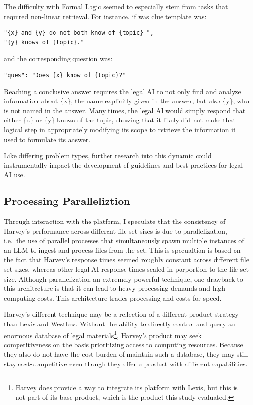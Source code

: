 \documentclass[
]{article}
\begin{document}
The difficulty with Formal Logic seemed to especially stem from tasks that required non-linear retrieval. For instance, if was clue template was:

\begin{verbatim}
"{x} and {y} do not both know of {topic}.",
"{y} knows of {topic}."
\end{verbatim}

and the corresponding question was:

\begin{verbatim}
"ques": "Does {x} know of {topic}?"
\end{verbatim}

Reaching a conclusive answer requires the legal AI to not only find and analyze information about \{x\}, the name explicitly given in the answer, but also \{y\}, who is not named in the answer. Many times, the legal AI would simply respond that either \{x\} or \{y\} knows of the topic, showing that it likely did not make that logical step in appropriately modifying its scope to retrieve the information it used to formulate its answer.

Like differing problem types, further research into this dynamic could instrumentally impact the development of guidelines and best practices for legal AI use.

\subsection{Processing Paralleliztion}\label{processing-paralleliztion}

Through interaction with the platform, I speculate that the consistency of Harvey's performance across different file set sizes is due to parallelization, i.e.~the use of parallel processes that simultaneously spawn multiple instances of an LLM to ingest and process files from the set. This is specualtion is based on the fact that Harvey's response times seemed roughly constant across different file set sizes, whereas other legal AI response times scaled in porportion to the file set size. Although parallelization an extremely powerful technique, one drawback to this architecture is that it can lead to heavy processing demands and high computing costs. This architecture trades processing and costs for speed.

Harvey's different technique may be a reflection of a different product strategy than Lexis and Westlaw. Without the ability to directly control and query an enormous database of legal materials\footnote{Harvey does provide a way to integrate its platform with Lexis, but this is not part of its base product, which is the product this study evaluated.}, Harvey's product may seek competitiveness on the basis prioritizing access to computing resources. Because they also do not have the cost burden of maintain such a database, they may still stay cost-competitive even though they offer a product with different capabilities.
\end{document}

